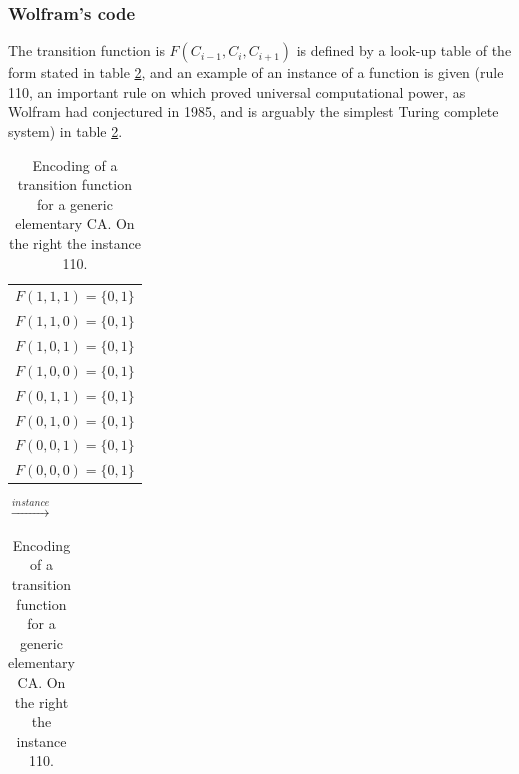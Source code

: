\subsubsection{Wolfram's code}
The transition function  is \begin{math}F(C_{i-1},C_i,C_{i+1})\end{math} is
defined by a look-up table of the form stated in table
\ref{wolframcodeGeneral}, and an example of an instance of a function is given
(rule 110, an important rule on which \cite{cook2004} proved universal
computational power, as Wolfram had conjectured in 1985, and is arguably the
simplest Turing complete system\cite{wolfram2002}) in table
\ref{wolframcodeGeneral}.

\begin{table}
\caption{Encoding of a transition function for a generic elementary CA. On the
right the instance 110.}
\centering
\begin{tabular}{l}
\label{wolframcodeGeneral}

\hfill \\
\hline
  \begin{math}F(1,1,1)=\{0,1\}\end{math}  \\
  \begin{math}F(1,1,0)=\{0,1\}\end{math}  \\
  \begin{math}F(1,0,1)=\{0,1\}\end{math}  \\
  \begin{math}F(1,0,0)=\{0,1\}\end{math}  \\
  \begin{math}F(0,1,1)=\{0,1\}\end{math}  \\
  \begin{math}F(0,1,0)=\{0,1\}\end{math}  \\
  \begin{math}F(0,0,1)=\{0,1\}\end{math}  \\
  \begin{math}F(0,0,0)=\{0,1\}\end{math}  \\
\hline
\end{tabular}
\quad
\begin{math}\overset{instance}{\longrightarrow}\end{math}
\begin{tabular}{l}


\end{tabular}
\end{table}
